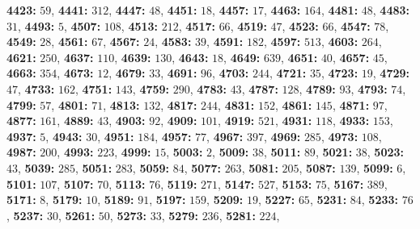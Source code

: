 \textsf{\bfseries 4423:} $59$, \textsf{\bfseries 4441:} $312$, \textsf{\bfseries 4447:} $48$, \textsf{\bfseries 4451:} $18$, \textsf{\bfseries 4457:} $17$, \textsf{\bfseries 4463:} $164$, \textsf{\bfseries 4481:} $48$, \textsf{\bfseries 4483:} $31$, \textsf{\bfseries 4493:} $5$, \textsf{\bfseries 4507:} $108$, \textsf{\bfseries 4513:} $212$, \textsf{\bfseries 4517:} $66$, \textsf{\bfseries 4519:} $47$, \textsf{\bfseries 4523:} $66$, \textsf{\bfseries 4547:} $78$, \textsf{\bfseries 4549:} $28$, \textsf{\bfseries 4561:} $67$, \textsf{\bfseries 4567:} $24$, \textsf{\bfseries 4583:} $39$, \textsf{\bfseries 4591:} $182$, \textsf{\bfseries 4597:} $513$, \textsf{\bfseries 4603:} $264$, \textsf{\bfseries 4621:} $250$, \textsf{\bfseries 4637:} $110$, \textsf{\bfseries 4639:} $130$, \textsf{\bfseries 4643:} $18$, \textsf{\bfseries 4649:} $639$, \textsf{\bfseries 4651:} $40$, \textsf{\bfseries 4657:} $45$, \textsf{\bfseries 4663:} $354$, \textsf{\bfseries 4673:} $12$, \textsf{\bfseries 4679:} $33$, \textsf{\bfseries 4691:} $96$, \textsf{\bfseries 4703:} $244$, \textsf{\bfseries 4721:} $35$, \textsf{\bfseries 4723:} $19$, \textsf{\bfseries 4729:} $47$, \textsf{\bfseries 4733:} $162$, \textsf{\bfseries 4751:} $143$, \textsf{\bfseries 4759:} $290$, \textsf{\bfseries 4783:} $43$, \textsf{\bfseries 4787:} $128$, \textsf{\bfseries 4789:} $93$, \textsf{\bfseries 4793:} $74$, \textsf{\bfseries 4799:} $57$, \textsf{\bfseries 4801:} $71$, \textsf{\bfseries 4813:} $132$, \textsf{\bfseries 4817:} $244$, \textsf{\bfseries 4831:} $152$, \textsf{\bfseries 4861:} $145$, \textsf{\bfseries 4871:} $97$, \textsf{\bfseries 4877:} $161$, \textsf{\bfseries 4889:} $43$, \textsf{\bfseries 4903:} $92$, \textsf{\bfseries 4909:} $101$, \textsf{\bfseries 4919:} $521$, \textsf{\bfseries 4931:} $118$, \textsf{\bfseries 4933:} $153$, \textsf{\bfseries 4937:} $5$, \textsf{\bfseries 4943:} $30$, \textsf{\bfseries 4951:} $184$, \textsf{\bfseries 4957:} $77$, \textsf{\bfseries 4967:} $397$, \textsf{\bfseries 4969:} $285$, \textsf{\bfseries 4973:} $108$, \textsf{\bfseries 4987:} $200$, \textsf{\bfseries 4993:} $223$, \textsf{\bfseries 4999:} $15$, \textsf{\bfseries 5003:} $2$, \textsf{\bfseries 5009:} $38$, \textsf{\bfseries 5011:} $89$, \textsf{\bfseries 5021:} $38$, \textsf{\bfseries 5023:} $43$, \textsf{\bfseries 5039:} $285$, \textsf{\bfseries 5051:} $283$, \textsf{\bfseries 5059:} $84$, \textsf{\bfseries 5077:} $263$, \textsf{\bfseries 5081:} $205$, \textsf{\bfseries 5087:} $139$, \textsf{\bfseries 5099:} $6$, \textsf{\bfseries 5101:} $107$, \textsf{\bfseries 5107:} $70$, \textsf{\bfseries 5113:} $76$, \textsf{\bfseries 5119:} $271$, \textsf{\bfseries 5147:} $527$, \textsf{\bfseries 5153:} $75$, \textsf{\bfseries 5167:} $389$, \textsf{\bfseries 5171:} $8$, \textsf{\bfseries 5179:} $10$, \textsf{\bfseries 5189:} $91$, \textsf{\bfseries 5197:} $159$, \textsf{\bfseries 5209:} $19$, \textsf{\bfseries 5227:} $65$, \textsf{\bfseries 5231:} $84$, \textsf{\bfseries 5233:} $76$, \textsf{\bfseries 5237:} $30$, \textsf{\bfseries 5261:} $50$, \textsf{\bfseries 5273:} $33$, \textsf{\bfseries 5279:} $236$, \textsf{\bfseries 5281:} $224$, 
